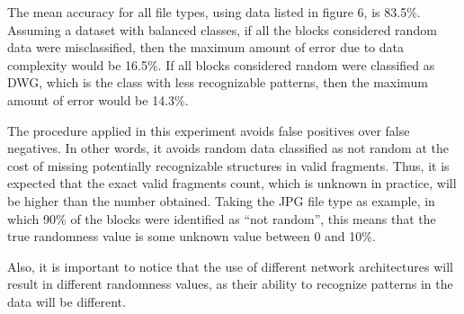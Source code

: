 The mean accuracy for all file types, using data listed in figure 6, is 83.5\%.  Assuming a dataset with balanced classes, if all the blocks considered random data were misclassified, then the maximum amount of error due to data complexity would be 16.5\%. If all blocks considered random were classified as DWG, which is the class with less recognizable patterns, then the maximum amount of error would be 14.3\%.


The procedure applied in this experiment avoids false positives over false negatives. In other words, it avoids random data classified as not random at the cost of missing potentially recognizable structures in valid fragments. Thus, it is expected that the exact valid fragments count, which is unknown in practice, will be higher than the number obtained. Taking the JPG file type as example, in which 90\% of the blocks were identified as ``not random'', this means that the true randomness value is some unknown value between 0 and 10\%.

Also, it is important to notice that the use of different network architectures will result in different randomness values, as their ability to recognize patterns in the data will be different.



